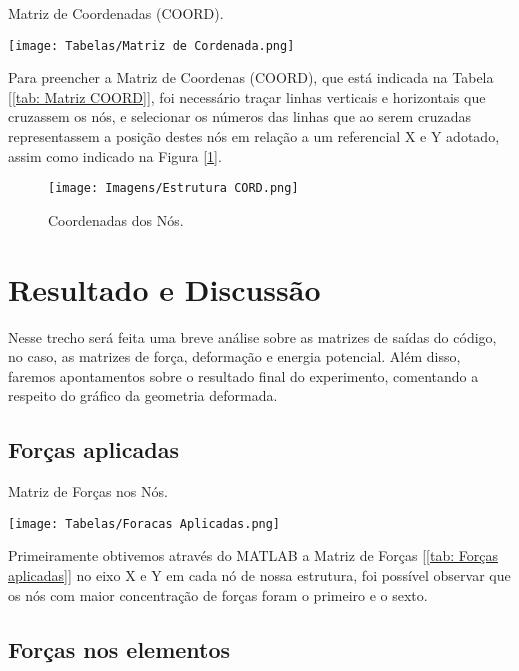 \documentclass[deposito, acronym, symbols]{fei}
\begin{document}
\begin{table}[!htb]
 \centering
    \caption{Matriz de Coordenadas (COORD).}
    \texttt{[image: Tabelas/Matriz de Cordenada.png]}
    \label{tab: Matriz COORD}
 \end{table}

Para preencher a Matriz de Coordenas (COORD), que está indicada na Tabela [\ref{tab: Matriz COORD}], foi necessário traçar linhas verticais e horizontais que cruzassem os nós, e selecionar os números das linhas que ao serem cruzadas representassem a posição destes nós em relação a um referencial X e Y adotado, assim como indicado na Figura [\ref{fig: Estrutura COORD}].

\begin{figure}[!htb]
 \centering
    \caption{Coordenadas dos Nós.}
    \texttt{[image: Imagens/Estrutura CORD.png]}
    \label{fig: Estrutura COORD}
 \end{figure}

\chapter{Resultado e Discussão}

Nesse trecho será feita uma breve análise sobre as matrizes de saídas do código, no caso, as matrizes de força, deformação e energia potencial. Além disso, faremos apontamentos sobre o resultado final do experimento, comentando a respeito do gráfico da geometria deformada.
 
\section{Forças aplicadas}

\begin{table}[!htb]
 \centering
    \caption{Matriz de Forças nos Nós.}
    \texttt{[image: Tabelas/Foracas Aplicadas.png]}
    \label{tab: Forças aplicadas}
 \end{table}

Primeiramente obtivemos através do MATLAB a Matriz de Forças [\ref{tab: Forças aplicadas}] no eixo X e Y em cada nó de nossa estrutura, foi possível observar que os nós com maior concentração de forças foram o primeiro e o sexto.

\section{Forças nos elementos}
\end{document}
